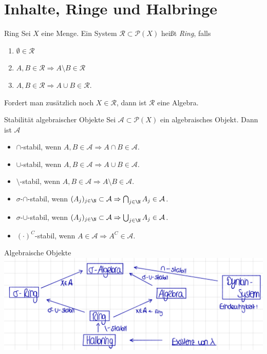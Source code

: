 \section*{Inhalte, Ringe und Halbringe}

\begin{karte}{Ring}
	Sei \(X\) eine Menge. Ein System \(\mathcal{R} \subset \mathcal{P}(X) \) heißt \textit{Ring}, falls 
	\begin{enumerate}
		\item \( \emptyset \in \mathcal{R} \)
		\item \( A,B \in \mathcal{R} \Rightarrow A\setminus B \in \mathcal{R} \)
		\item \( A,B \in \mathcal{R} \Rightarrow A \cup B \in \mathcal{R} \).
	\end{enumerate}
	Fordert man zusätzlich noch \(X \in \mathcal{R}\), dann ist \(\mathcal{R}\) eine Algebra.
\end{karte}

\begin{karte}{Stabilität algebraischer Objekte}
	Sei \( \mathcal{A} \subset \mathcal{P}(X) \) ein algebraisches Objekt. 
	Dann ist \( \mathcal{A} \)
	\begin{itemize}
		\item \(\cap\)-stabil, wenn \( A,B\in \mathcal{A} \Rightarrow A \cap B \in \mathcal{A} \).
		\item \(\cup\)-stabil, wenn \( A,B\in \mathcal{A} \Rightarrow A \cup B \in \mathcal{A} \).
		\item \(\setminus\)-stabil, wenn \( A,B\in \mathcal{A} \Rightarrow A \setminus B \in \mathcal{A} \).
		\item \(\sigma\)-\(\cap\)-stabil, wenn \( (A_j)_{j\in\N} \subset \mathcal{A} \Rightarrow \bigcap_{j\in\N} A_j \in \mathcal{A} \).
		\item \(\sigma\)-\(\cup\)-stabil, wenn \( (A_j)_{j\in\N} \subset \mathcal{A} \Rightarrow \bigcup_{j\in\N} A_j \in \mathcal{A} \).
		\item \( (\cdot)^C\)-stabil, wenn \( A \in \mathcal{A} \Rightarrow A^C \in \mathcal{A} \).
	\end{itemize}
\end{karte}

\begin{karte}{Algebraische Objekte}
	\centering
	\includegraphics[height=0.33\textwidth]{algebraische-objekte-zusammenhang.png}
\end{karte}

